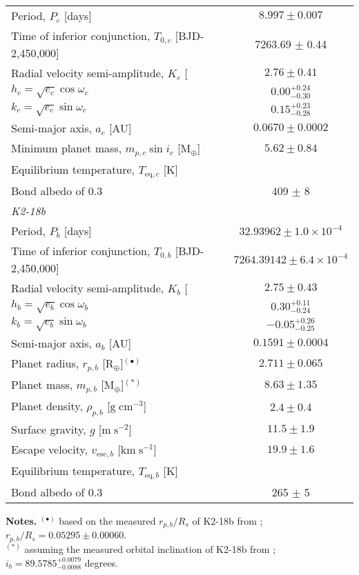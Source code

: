 \begin{table*}
\begin{tabular}{lc}
Period, $P_c$ [days] & $8.997 \pm 0.007$  \\
Time of inferior conjunction, $T_{0,c}$ [BJD-2,450,000] & 7263.69 $\pm$ 0.44 \\
Radial velocity semi-amplitude, $K_c$ [\mps{]} & $2.76 \pm 0.41$ \\
$h_c =\sqrt{e_c}\cos{\omega_c}$ & $0.00^{+0.24}_{-0.30}$ \\
$k_c =\sqrt{e_c}\sin{\omega_c}$ & $0.15^{+0.23}_{-0.28}$ \\
Semi-major axis, $a_c$ [AU] & $0.0670 \pm 0.0002$ \\
Minimum planet mass, $m_{p,c} \sin{i_c}$ [M$_{\oplus}$] & $5.62 \pm 0.84$ \\
Equilibrium temperature, $T_{\text{eq},c}$ [K] & \\
\hspace{2pt} Bond albedo of 0.3 & 409 $\pm$ 8 \medskip \\
\emph{K2-18b} & \smallskip \\
Period, $P_b$ [days] & $32.93962 \pm 1.0 \times 10^{-4}$ \\
Time of inferior conjunction, $T_{0,b}$ [BJD-2,450,000] & $7264.39142 \pm 6.4 \times 10^{-4}$ \\
Radial velocity semi-amplitude, $K_b$ [\mps{]} & $2.75 \pm 0.43$ \\
$h_b =\sqrt{e_b}\cos{\omega_b}$ & $0.30^{+0.11}_{-0.24}$ \\
$k_b =\sqrt{e_b}\sin{\omega_b}$ & $-0.05^{+0.26}_{-0.25}$ \\
Semi-major axis, $a_b$ [AU] & $0.1591 \pm 0.0004$ \\
Planet radius, $r_{p,b}$ [R$_{\oplus}$]$^{(\bullet)}$ & $2.711\pm 0.065$ \\
Planet mass, $m_{p,b}$ [M$_{\oplus}$]$^{(\ast)}$ & $8.63 \pm 1.35$ \\
Planet density, $\rho_{p,b}$ [$\mathrm{g\;cm^{-3}}$] & $2.4\pm 0.4$ \\
Surface gravity, $g$ [$\mathrm{m\;s^{-2}}$]  & $11.5\pm 1.9$ \\
Escape velocity, $v_{\text{esc},b}$ [$\mathrm{km\;s^{-1}}$] & $19.9\pm 1.6$ \\
Equilibrium temperature, $T_{\text{eq},b}$ [K] & \\
\hspace{2pt} Bond albedo of 0.3 & 265 $\pm$ 5 \medskip \\
\hline
\end{tabular}
\begin{list}{}{}
\item {\bf{Notes.}}
  $^{(\bullet)}$ based on the measured $r_{p,b}/R_s$ of K2-18b from \cite{benneke17}; $r_{p,b}/R_s=0.05295\pm 0.00060$. \\
  $^{(\ast)}$ assuming the measured orbital inclination of K2-18b from \cite{benneke17}; $i_b = 89.5785^{+0.0079}_{-0.0088}$ degrees. \\
\end{list}
\end{table*}
